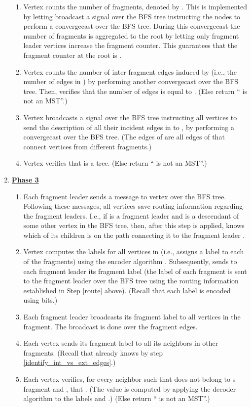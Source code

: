 \documentclass[11pt,letter]{article}
\begin{document}
\begin{enumerate}
\begin{enumerate}
\item \label{count_fragments}  
Vertex  counts the number of fragments, denoted by . This is implemented by letting  broadcast a signal over the BFS tree instructing the nodes to perform a convergecast 
over the BFS tree. During this convergecast the number of fragments is aggregated to the root  by letting only fragment leader vertices increase 
the fragment counter. This guarantees that the fragment  counter at the root  is .
\item \label{count_inter_fragment}
Vertex  counts the number of inter fragment 
edges induced by  (i.e., the number of edges in ) by performing another convergecast over the BFS tree. Then,  verifies that the number of edges is equal to . 
(Else return `` is not an MST''.) 
\item \label{send_Tf}
Vertex  broadcasts a signal over the BFS tree instructing all vertices to send  the description of all their incident edges in  
to , by performing a convergecast over the BFS tree. (The edges of  are 
all edges of  that connect vertices from different fragments.)
\item \label{verify_tree}Vertex  verifies that  is a tree. 
(Else return `` is not an MST''.)
\end{enumerate}

\item 
{\bf \underline{Phase 3}}
\begin{enumerate} 
\item \label{route}
Each fragment leader sends a message to vertex  over the BFS tree. 
Following these messages, all vertices save routing information regarding the fragment leaders.
I.e., if  is a fragment leader and  is a descendant of some other vertex  in the BFS tree, then, 
after this step is applied,  knows which of its children is on the path connecting it to  the fragment leader .
\item \label{encode}
Vertex  computes  the labels  for all vertices  in 
(i.e., assigns a label to each of the fragments) 
using the encoder algorithm . Subsequently,  sends to each 
fragment leader its fragment label 
(the label of each fragment is sent to the fragment leader over the BFS tree 
using the routing information established in Step \ref{route} above).
(Recall that each label is encoded using  bits.)
\item \label{send_labels_leaders}
Each fragment leader broadcasts its fragment label to all vertices in the fragment. The broadcast is done over the fragment edges.
\item \label{send_labels_neig}
Each vertex  sends its fragment label to all its neighbors in other 
fragments. (Recall that  already knows  by step 
\ref{identify_int_vs_ext_edges}.)
\item \label{verify_cycle_heavy}Each vertex  verifies, for every 
neighbor  such that  does not belong to s fragment and 
, that . 
(The value  is computed by applying 
the decoder algorithm  to the labels  and .) 
(Else return `` is not an MST''.)
\end{enumerate}
\end{enumerate}
\end{document}
